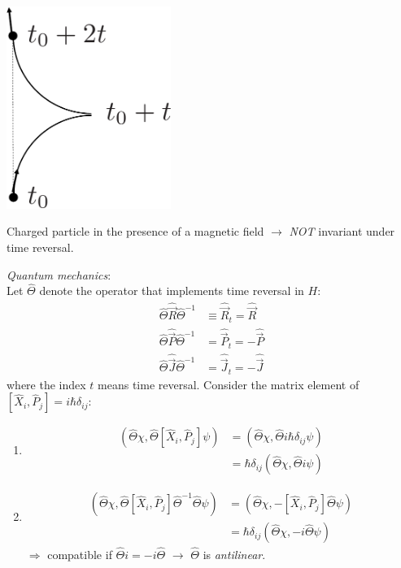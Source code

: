 \documentclass[12pt]{article}
\newcommand{\be}{\begin{equation}}
\newcommand{\ee}{\end{equation}}
\begin{document}
\begin{minipage}{0.5\textwidth}%
\centering
\includegraphics[width=0.4\textwidth]{Figures/TimeReversal2-crop.pdf}
\end{minipage}%
\begin{minipage}{0.5\textwidth}%
Charged particle in the presence of a 
magnetic field $\to$ \emph{NOT} invariant under
time reversal.
\end{minipage}%

\emph{Quantum mechanics}:\\
Let $\hat{\Theta}$ denote the operator that implements time
reversal in $H$:
\be
\begin{aligned}
\hat{\Theta}\hat{\vec{R}}\hat{\Theta}^{-1} &\equiv \hat{\vec{R}}_t = \hat{\vec{R}}\\
\hat{\Theta}\hat{\vec{P}}\hat{\Theta}^{-1} &=      \hat{\vec{P}}_t = -\hat{\vec{P}}\\
\hat{\Theta}\hat{\vec{J}}\hat{\Theta}^{-1} &=  	   \hat{\vec{J}}_t = -\hat{\vec{J}}
\end{aligned}
\ee
where the index $t$ means time reversal. Consider the matrix element of $[\hat{X}_i,\hat{P}_j] = i\hbar\delta_{ij}$:
\begin{enumerate}
\item 
\be
\begin{aligned}
\left(\hat{\Theta}\chi,\hat{\Theta}[\hat{X}_i,\hat{P}_j]\psi\right)
&=\left(\hat{\Theta}\chi,\hat{\Theta}i\hbar\delta_{ij}\psi\right)\\
&=\hbar\delta_{ij}\left(\hat{\Theta}\chi,\hat{\Theta}i\psi\right)
\end{aligned}
\ee
\item
\be
\begin{aligned}
\left(\hat{\Theta}\chi,\hat{\Theta}[\hat{X}_i,\hat{P}_j]\hat{\Theta}^{-1}\hat{\Theta}\psi\right)
&=\left(\hat{\Theta}\chi,-[\hat{X}_i,\hat{P}_j]\hat{\Theta}\psi\right)\\
&=\hbar\delta_{ij}(\hat{\Theta}\chi,-i\hat{\Theta}\psi)
\end{aligned}
\ee
$\Rightarrow$ compatible if $\hat{\Theta}i = -i\hat{\Theta}$ $\to$ $\hat{\Theta}$ is \emph{antilinear}.
\end{enumerate}
\end{document}
